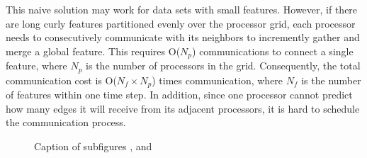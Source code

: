 \documentclass[10pt, conference, compsocconf]{IEEEtran}
\begin{document}
This naive solution may work for data sets with small features. However, if there are long curly features partitioned evenly over the processor grid, each processor needs to consecutively communicate with its neighbors to incremently gather and merge a global feature. This requires O(${N_p}$) communications to connect a single feature, where ${N_p}$ is the number of processors in the grid. Consequently, the total communication cost is O(${N_f \times N_p}$) times communication, where ${N_f}$ is the number of features within one time step. In addition, since one processor cannot predict how many edges it will receive from its adjacent processors, it is hard to schedule the communication process.

\begin{figure}[ht]
  \centering
  \caption[Optional caption for list of figures]{Caption of subfigures ,  and }
\end{figure}
\end{document}
